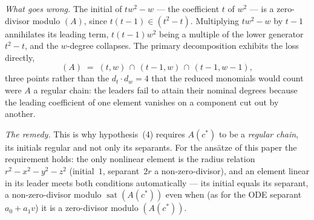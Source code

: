 \documentclass{article}
\theoremstyle{definition}
\theoremstyle{plain}
\begin{document}
{\it What goes wrong.}
The initial of $t w^2 - w$ --- the coefficient $t$ of $w^2$ --- is a
zero-divisor modulo $(A)$, since $t(t - 1) \in (t^2 - t)$.  Multiplying
$t w^2 - w$ by $t - 1$ annihilates its leading term, $t(t-1)w^2$ being a
multiple of the lower generator $t^2 - t$, and the $w$-degree collapses.
The primary decomposition exhibits the loss directly,
%
\[
(A) \;=\; (t, w) \,\cap\, (t-1, w) \,\cap\, (t-1, w-1),
\]
%
three points rather than the $d_t \cdot d_w = 4$ that the reduced monomials
would count were $A$ a regular chain: the leaders fail to attain their
nominal degrees because the leading coefficient of one element vanishes on a
component cut out by another.

{\it The remedy.}
This is why hypothesis~(4) requires $A(c^*)$ to be a {\it regular chain},
its initials regular and not only its separants.  For the ans\"atze of this
paper the requirement holds: the only nonlinear element is the radius
relation $r^2 - x^2 - y^2 - z^2$ (initial~$1$, separant~$2r$ a
non-zero-divisor), and an element linear in its leader meets both conditions
automatically --- its initial equals its separant, a non-zero-divisor
modulo $\operatorname{sat}(A(c^*))$ even when (as for the ODE separant
$a_0 + a_1 v$) it is a zero-divisor modulo $(A(c^*))$.
\end{document}
